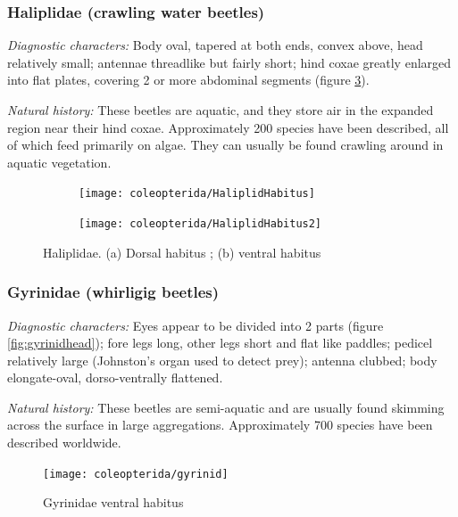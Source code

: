 \subsubsection{Haliplidae (crawling water beetles)}
\noindent{}\textit{Diagnostic characters:} Body oval, tapered at both ends, convex above, head relatively small; antennae threadlike but fairly short; hind coxae greatly enlarged into flat plates, covering 2 or more abdominal segments (figure \ref{fig:haliplididvent}).\vspace{3mm}

\noindent{}\textit{Natural history:} These beetles are aquatic, and they store air in the expanded region near their hind coxae. Approximately 200 species have been described, all of which feed primarily on algae. They can usually be found crawling around in aquatic vegetation.

\begin{figure}[ht!]
  \centering
\begin{subfigure}[ht!]{0.22\textwidth}
   \texttt{[image: coleopterida/HaliplidHabitus]}
   \caption{}
    \label{fig:halipliddors}
\end{subfigure}
    \qquad
\begin{subfigure}[ht!]{0.45\textwidth}
\texttt{[image: coleopterida/HaliplidHabitus2]}
   \caption{}
    \label{fig:haliplididvent}
\end{subfigure}
    \caption{Haliplidae. (a) Dorsal habitus \citep[][Fig. 13:4a]{bhlitem126080aquatic}; (b) ventral habitus \citep[][Fig. 34]{bhlitem36600}}
\end{figure}


\subsubsection{Gyrinidae (whirligig beetles)}
\noindent{}\textit{Diagnostic characters:} Eyes appear to be divided into 2 parts (figure \ref{fig:gyrinidhead}); fore legs long, other legs short and flat like paddles; pedicel relatively large (Johnston's organ used to detect prey); antenna clubbed; body elongate-oval, dorso-ventrally flattened.\vspace{3mm}

\noindent{}\textit{Natural history:} These beetles are semi-aquatic and are usually found skimming across the surface in large aggregations. Approximately 700 species have been described worldwide.

\begin{figure}[ht!]
  \centering
    \texttt{[image: coleopterida/gyrinid]}
  \caption{Gyrinidae ventral habitus \citep[][Fig. 99B]{bhlitem56570}}
  \label{fig:gyrnidhabitus}
\end{figure}

